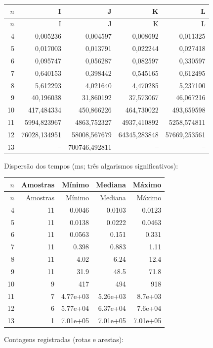 \begin{longtable}{rrrrr}
\toprule
$n$ & I & J & K & L \\
\midrule\endfirsthead
\toprule $n$ & I & J & K & L \\
\midrule\endhead
4 & 0,005236 & 0,004597 & 0,008692 & 0,011325 \\
5 & 0,017003 & 0,013791 & 0,022244 & 0,027418 \\
6 & 0,095747 & 0,056287 & 0,082597 & 0,330597 \\
7 & 0,640153 & 0,398442 & 0,545165 & 0,612495 \\
8 & 5,612293 & 4,021640 & 4,470285 & 5,237100 \\
9 & 40,196038 & 31,860192 & 37,573067 & 46,067216 \\
10 & 417,484334 & 450,866226 & 464,730022 & 493,659598 \\
11 & 5994,823967 & 4863,752327 & 4937,410892 & 5258,574811 \\
12 & 76028,134951 & 58008,567679 & 64345,283848 & 57669,253561 \\
13 & -- & 700746,492811 & -- & -- \\
\bottomrule
\end{longtable}
\endgroup
\noindent Dispersão dos tempos (ms; três algarismos significativos):
\begin{longtable}{rrrrr}
\toprule
$n$ & Amostras & Mínimo & Mediana & Máximo \\
\midrule\endfirsthead
\toprule
$n$ & Amostras & Mínimo & Mediana & Máximo \\
\midrule\endhead
4 & 11 & 0.0046 & 0.0103 & 0.0123 \\
5 & 11 & 0.0138 & 0.0222 & 0.0463 \\
6 & 11 & 0.0563 & 0.151 & 0.331 \\
7 & 11 & 0.398 & 0.883 & 1.11 \\
8 & 11 & 4.02 & 6.24 & 12.4 \\
9 & 11 & 31.9 & 48.5 & 71.8 \\
10 & 9 & 417 & 494 & 918 \\
11 & 7 & 4.77e+03 & 5.26e+03 & 8.7e+03 \\
12 & 6 & 5.77e+04 & 6.37e+04 & 7.6e+04 \\
13 & 1 & 7.01e+05 & 7.01e+05 & 7.01e+05 \\
\bottomrule
\end{longtable}
\noindent Contagens registradas (rotas e arestas):

